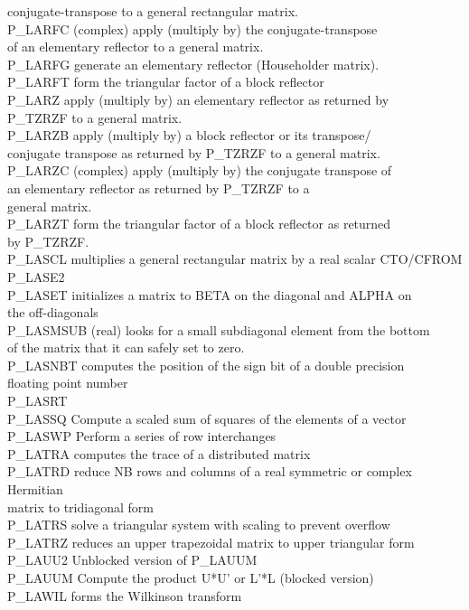 \documentclass[11pt]{report}
\begin{document}
\begin{tabbing}
         \> conjugate-transpose to a general rectangular matrix.\\
P\_LARFC \> (complex) apply (multiply by) the conjugate-transpose \\
         \> of an elementary reflector to a general matrix.\\
P\_LARFG \> generate an elementary reflector (Householder matrix).\\
P\_LARFT \> form the triangular factor of a block reflector \\
P\_LARZ  \> apply (multiply by) an elementary reflector as returned by \\
         \> P\_TZRZF to a general matrix.\\
P\_LARZB \> apply (multiply by) a block reflector or its transpose/ \\
         \> conjugate transpose as returned by P\_TZRZF to a general matrix.\\
P\_LARZC \> (complex) apply (multiply by) the conjugate transpose of \\
         \> an elementary reflector as returned by P\_TZRZF to a \\
         \> general matrix.\\
P\_LARZT \> form the triangular factor of a block reflector as returned \\
         \> by P\_TZRZF.\\
P\_LASCL \> multiplies a general rectangular matrix by a real scalar CTO/CFROM \\
P\_LASE2 \>  \\
P\_LASET \> initializes a matrix to BETA on the diagonal and ALPHA on \\
        \> the off-diagonals \\
P\_LASMSUB \> (real) looks for a small subdiagonal element from the bottom \\
        \> of the matrix that it can safely set to zero. \\
P\_LASNBT \> computes the position of the sign bit of a double precision \\
         \> floating point number \\
P\_LASRT \> \\
P\_LASSQ \> Compute a scaled sum of squares of the elements of a vector\\
P\_LASWP \> Perform a series of row interchanges\\
P\_LATRA \> computes the trace of a distributed matrix \\
P\_LATRD \> reduce NB rows and columns of a real symmetric or complex Hermitian \\
        \> matrix to tridiagonal form \\
P\_LATRS \> solve a triangular system with scaling to prevent overflow \\
P\_LATRZ \> reduces an upper trapezoidal matrix to upper triangular form \\
P\_LAUU2 \> Unblocked version of P\_LAUUM\\
P\_LAUUM \> Compute the product U*U' or L'*L (blocked version)\\
P\_LAWIL \> forms the Wilkinson transform \\
\end{tabbing}
\clearpage
\end{document}
